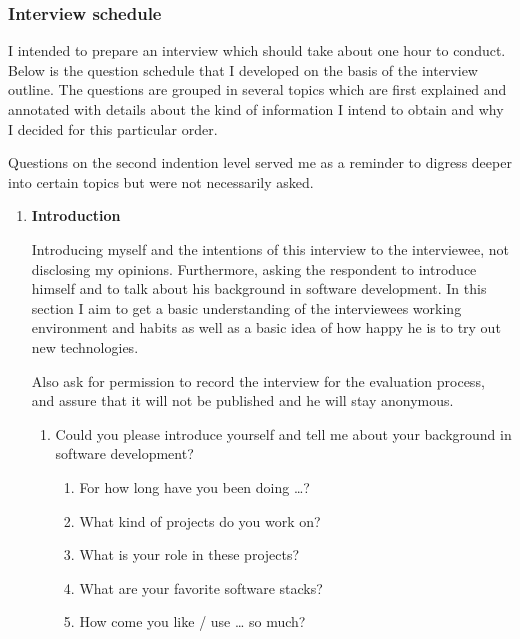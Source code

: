 \subsubsection{Interview schedule}

I intended to prepare an interview which should take about one hour to conduct. Below is the question schedule that I developed on the basis of the interview outline. The questions are grouped in several topics which are first explained and annotated with details about the kind of information I intend to obtain and why I decided for this particular order.

Questions on the second indention level served me as a reminder to digress deeper into certain topics but were not necessarily asked.

\begin{enumerate}

	\item \textbf{Introduction}

	Introducing myself and the intentions of this interview to the interviewee, not disclosing my opinions. Furthermore, asking the respondent to introduce himself and to talk about his background in software development. In this section I aim to get a basic understanding of the interviewees working environment and habits as well as a basic idea of how happy he is to try out new technologies.

	Also ask for permission to record the interview for the evaluation process, and assure that it will not be published and he will stay anonymous.

	\begin{enumerate}

		\item Could you please introduce yourself and tell me about your background in software development?

		\begin{enumerate}

			\item For how long have you been doing …?

			\item What kind of projects do you work on?

			\item What is your role in these projects?

			\item What are your favorite software stacks?

			\item How come you like / use … so much?


\end{enumerate}
\end{enumerate}
\end{enumerate}
